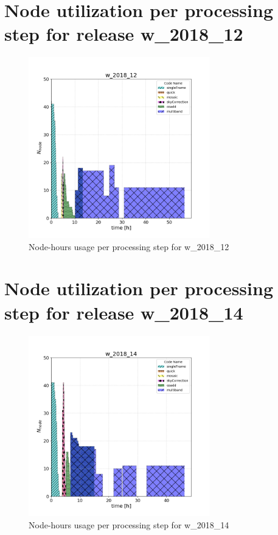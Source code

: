 \clearpage
\section{Node utilization per processing step for release w\_2018\_12}

\begin{figure}[h]
  \centering
  \includegraphics[width=0.70\textwidth]{figures/usage-w_2018_12-ultimate.png}
  \caption{Node-hours usage per processing step for w\_2018\_12}
  \label{fig:PerTask12}
\end{figure}


\clearpage
\section{Node utilization per processing step for release w\_2018\_14}

\begin{figure}[h]
  \centering
  \includegraphics[width=0.70\textwidth]{figures/usage-w_2018_14-ultimate.png}
  \caption{Node-hours usage per processing step for w\_2018\_14}
  \label{fig:PerTask14}
\end{figure}


